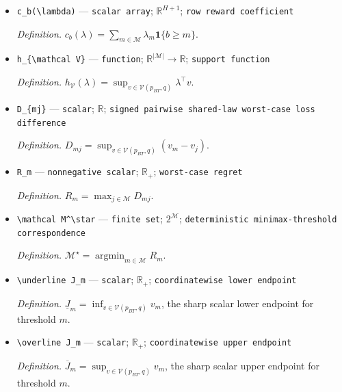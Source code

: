 \documentclass{article}
\begin{document}
\begin{itemize}
  \par\smallskip\noindent\emph{Definition.} \texttt{A support-\allowbreak{}function direction for the joint value set.}
  \item \texttt{c\_\allowbreak{}b(\textbackslash{}\allowbreak{}lambda)} --- \texttt{scalar array}; \(\mathbb R^{H+1}\); \texttt{row reward coefficient}
  \par\smallskip\noindent\emph{Definition.} \(c_b(\lambda)=\sum_{m\in\mathcal M}\lambda_m\mathbf 1\{b\ge m\}\).
  \item \texttt{h\_\allowbreak{}\{\textbackslash{}\allowbreak{}mathcal V\}\allowbreak{}} --- \texttt{function}; \(\mathbb R^{|\mathcal M|}\to\mathbb R\); \texttt{support function}
  \par\smallskip\noindent\emph{Definition.} \(h_{\mathcal V}(\lambda)=\sup_{v\in\mathcal V(p_{BT},q)}\lambda^\top v\).
  \item \texttt{D\_\allowbreak{}\{mj\}\allowbreak{}} --- \texttt{scalar}; \(\mathbb R\); \texttt{signed pairwise shared-\allowbreak{}law worst-\allowbreak{}case loss difference}
  \par\smallskip\noindent\emph{Definition.} \(D_{mj}=\sup_{v\in\mathcal V(p_{BT},q)}(v_m-v_j)\).
  \item \texttt{R\_\allowbreak{}m} --- \texttt{nonnegative scalar}; \(\mathbb R_+\); \texttt{worst-\allowbreak{}case regret}
  \par\smallskip\noindent\emph{Definition.} \(R_m=\max_{j\in\mathcal M}D_{mj}\).
  \item \texttt{\textbackslash{}\allowbreak{}mathcal M\textasciicircum{}\textbackslash{}\allowbreak{}star} --- \texttt{finite set}; \(2^{\mathcal M}\); \texttt{deterministic minimax-\allowbreak{}threshold correspondence}
  \par\smallskip\noindent\emph{Definition.} \(\mathcal M^\star=\operatorname*{argmin}_{m\in\mathcal M}R_m\).
  \item \texttt{\textbackslash{}\allowbreak{}underline J\_\allowbreak{}m} --- \texttt{scalar}; \(\mathbb R_+\); \texttt{coordinatewise lower endpoint}
  \par\smallskip\noindent\emph{Definition.} \(\underline J_m=\inf_{v\in\mathcal V(p_{BT},q)}v_m\), the sharp scalar lower endpoint for threshold \(m\).
  \item \texttt{\textbackslash{}\allowbreak{}overline J\_\allowbreak{}m} --- \texttt{scalar}; \(\mathbb R_+\); \texttt{coordinatewise upper endpoint}
  \par\smallskip\noindent\emph{Definition.} \(\overline J_m=\sup_{v\in\mathcal V(p_{BT},q)}v_m\), the sharp scalar upper endpoint for threshold \(m\).

\end{itemize}
\end{document}
